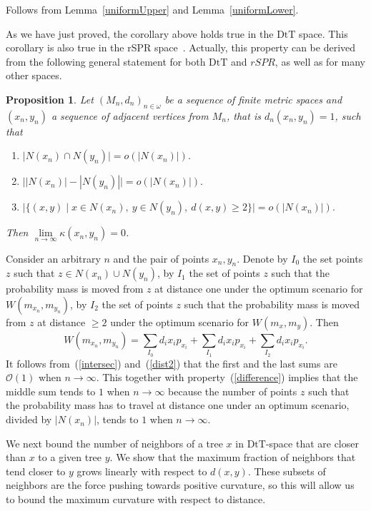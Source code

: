 \documentclass{amsart}
\newtheorem{proposition}[lemma]{Proposition}
\newcommand{\dts}{\mathrm{DtT}}
\renewcommand{\O}{\mathcal{O}}
\begin{document}
\proof
Follows from Lemma~\ref{uniformUpper} and Lemma~\ref{uniformLower}.
\endproof

As we have just proved, the corollary above holds true in the $\dts$ space. 
This corollary is also true in the rSPR space~\cite{Whidden2015-es}.
Actually, this property can be derived from the following general statement 
for both $\dts$ and $rSPR$, as well as for many other spaces. 

\begin{proposition}\label{flatInLimGen}
Let $(M_n,d_n)_{n \in \omega}$ be a sequence of finite metric spaces and 
$(x_n, y_n)$ a sequence of adjacent vertices from $M_n$, 
that is $d_n(x_n,y_n) = 1$, such that 
\begin{enumerate}[(1)]
\item\label{intersec} $\big|N(x_n) \cap N(y_n)\big| = o(|N(x_n)|).$ 
\item\label{difference} $\big||N(x_n)| - |N(y_n)|\big| = o(|N(x_n)|).$ 
\item\label{dist2} $\big|\{(x,y) \mid 
	x \in N(x_n),~ y \in N(y_n),~ d(x, y) \geq 2\}\big| = o(|N(x_n)|).$
\end{enumerate}

Then $\lim\limits_{n \to \infty} \kappa(x_n, y_n) = 0$. 
\end{proposition}

\proof
Consider an arbitrary $n$ and the pair of points $x_n,y_n$. Denote by $I_0$ the
set points $z$ such that $z \in N(x_n) \cup N(y_n)$, by $I_1$ the set of points
$z$ such that the probability mass is moved from $z$ at distance one under the
optimum scenario for $W(m_{x_n},m_{y_n})$, by $I_2$ the set of points $z$ such that 
the probability mass is moved from $z$ at distance $\geq 2$ under the optimum 
scenario for $W(m_x,m_y)$. Then 
\[
W(m_{x_n},m_{y_n}) = \sum_{I_0} d_i x_i p_{x_i} + \sum_{I_1} d_i x_i p_{x_i} + 
\sum_{I_2} d_i x_i p_{x_i}.
\]
It follows from~(\ref{intersec}) and~(\ref{dist2}) that the first and the last sums
are $\O(1)$ when $n\to\infty$. This together with property~(\ref{difference}) 
implies that the middle sum tends to $1$ when $n\to\infty$ because the number of
points $z$ such that the probability mass has to travel at distance one under an
optimum scenario, divided by $|N(x_n)|$, tends to $1$ when $n\to\infty$. 
\endproof

We next bound the number of neighbors of a tree $x$ in $\dts$-space that are closer than $x$ to a given tree $y$.
We show that the maximum fraction of neighbors that tend closer to $y$ grows linearly with respect to $d(x,y)$.
These subsets of neighbors are the force pushing towards positive curvature, so this will allow us to bound the maximum curvature with respect to distance.
\end{document}
